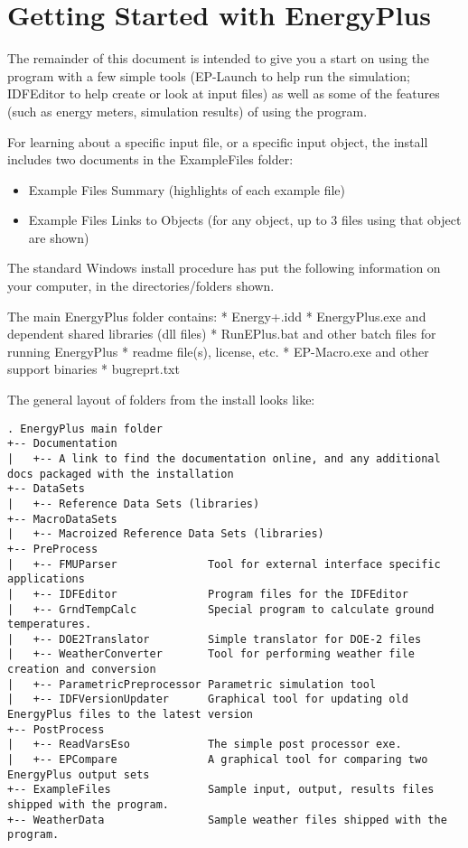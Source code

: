 \chapter{Getting Started with EnergyPlus}\label{getting-started-with-energyplus}

The remainder of this document is intended to give you a start on using the program with a few simple tools (EP-Launch to help run the simulation; IDFEditor to help create or look at input files) as well as some of the features (such as energy meters, simulation results) of using the program.

For learning about a specific input file, or a specific input object, the install includes two documents in the ExampleFiles folder:

\begin{itemize}
\item
  Example Files Summary (highlights of each example file)
\item
  Example Files Links to Objects (for any object, up to 3 files using that object are shown)
\end{itemize}

The standard Windows install procedure has put the following information on your computer, in the directories/folders shown.

The main EnergyPlus folder contains: * Energy+.idd * EnergyPlus.exe and dependent shared libraries (dll files) * RunEPlus.bat and other batch files for running EnergyPlus * readme file(s), license, etc. * EP-Macro.exe and other support binaries * bugreprt.txt~

The general layout of folders from the install looks like:

\begin{lstlisting}
. EnergyPlus main folder
+-- Documentation
|   +-- A link to find the documentation online, and any additional docs packaged with the installation
+-- DataSets
|   +-- Reference Data Sets (libraries)
+-- MacroDataSets
|   +-- Macroized Reference Data Sets (libraries)
+-- PreProcess
|   +-- FMUParser              Tool for external interface specific applications
|   +-- IDFEditor              Program files for the IDFEditor
|   +-- GrndTempCalc           Special program to calculate ground temperatures.
|   +-- DOE2Translator         Simple translator for DOE-2 files
|   +-- WeatherConverter       Tool for performing weather file creation and conversion
|   +-- ParametricPreprocessor Parametric simulation tool
|   +-- IDFVersionUpdater      Graphical tool for updating old EnergyPlus files to the latest version
+-- PostProcess
|   +-- ReadVarsEso            The simple post processor exe.
|   +-- EPCompare              A graphical tool for comparing two EnergyPlus output sets
+-- ExampleFiles               Sample input, output, results files shipped with the program.
+-- WeatherData                Sample weather files shipped with the program.
\end{lstlisting}
